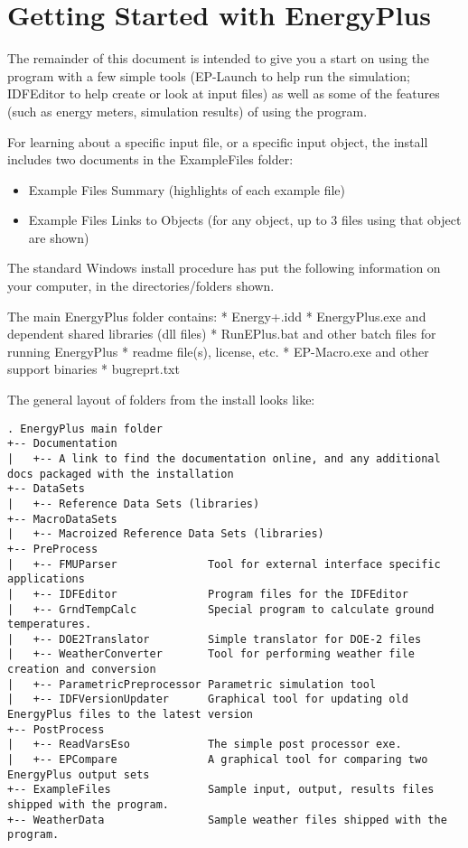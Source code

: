 \chapter{Getting Started with EnergyPlus}\label{getting-started-with-energyplus}

The remainder of this document is intended to give you a start on using the program with a few simple tools (EP-Launch to help run the simulation; IDFEditor to help create or look at input files) as well as some of the features (such as energy meters, simulation results) of using the program.

For learning about a specific input file, or a specific input object, the install includes two documents in the ExampleFiles folder:

\begin{itemize}
\item
  Example Files Summary (highlights of each example file)
\item
  Example Files Links to Objects (for any object, up to 3 files using that object are shown)
\end{itemize}

The standard Windows install procedure has put the following information on your computer, in the directories/folders shown.

The main EnergyPlus folder contains: * Energy+.idd * EnergyPlus.exe and dependent shared libraries (dll files) * RunEPlus.bat and other batch files for running EnergyPlus * readme file(s), license, etc. * EP-Macro.exe and other support binaries * bugreprt.txt~

The general layout of folders from the install looks like:

\begin{lstlisting}
. EnergyPlus main folder
+-- Documentation
|   +-- A link to find the documentation online, and any additional docs packaged with the installation
+-- DataSets
|   +-- Reference Data Sets (libraries)
+-- MacroDataSets
|   +-- Macroized Reference Data Sets (libraries)
+-- PreProcess
|   +-- FMUParser              Tool for external interface specific applications
|   +-- IDFEditor              Program files for the IDFEditor
|   +-- GrndTempCalc           Special program to calculate ground temperatures.
|   +-- DOE2Translator         Simple translator for DOE-2 files
|   +-- WeatherConverter       Tool for performing weather file creation and conversion
|   +-- ParametricPreprocessor Parametric simulation tool
|   +-- IDFVersionUpdater      Graphical tool for updating old EnergyPlus files to the latest version
+-- PostProcess
|   +-- ReadVarsEso            The simple post processor exe.
|   +-- EPCompare              A graphical tool for comparing two EnergyPlus output sets
+-- ExampleFiles               Sample input, output, results files shipped with the program.
+-- WeatherData                Sample weather files shipped with the program.
\end{lstlisting}
